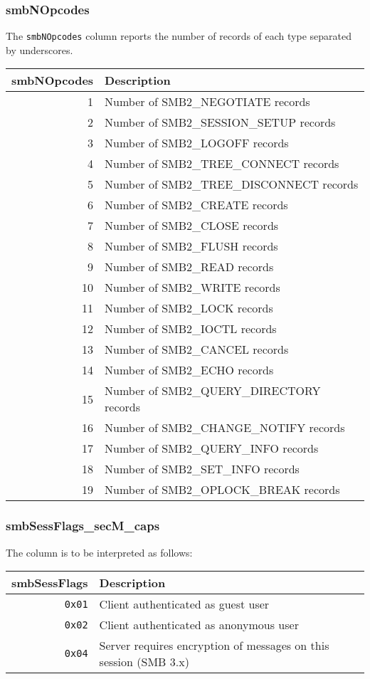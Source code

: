 \documentclass[documentation]{subfiles}
\begin{document}
\subsubsection{smbNOpcodes}\label{smbNOpcodes}
The {\tt smbNOpcodes} column reports the number of records of each type separated by underscores.
\begin{longtable}{rl}
    \toprule
    {\bf smbNOpcodes} & {\bf Description}\\
    \midrule\endhead%
    1  & Number of SMB2\_NEGOTIATE records\\
    2  & Number of SMB2\_SESSION\_SETUP records\\
    3  & Number of SMB2\_LOGOFF records\\
    4  & Number of SMB2\_TREE\_CONNECT records\\
    5  & Number of SMB2\_TREE\_DISCONNECT records\\
    6  & Number of SMB2\_CREATE records\\
    7  & Number of SMB2\_CLOSE records\\
    8  & Number of SMB2\_FLUSH records\\
    9  & Number of SMB2\_READ records\\
    10 & Number of SMB2\_WRITE records\\
    11 & Number of SMB2\_LOCK records\\
    12 & Number of SMB2\_IOCTL records\\
    13 & Number of SMB2\_CANCEL records\\
    14 & Number of SMB2\_ECHO records\\
    15 & Number of SMB2\_QUERY\_DIRECTORY records\\
    16 & Number of SMB2\_CHANGE\_NOTIFY records\\
    17 & Number of SMB2\_QUERY\_INFO records\\
    18 & Number of SMB2\_SET\_INFO records\\
    19 & Number of SMB2\_OPLOCK\_BREAK records\\
    \bottomrule
\end{longtable}

\subsubsection{smbSessFlags\_secM\_caps}\label{smbSessFlagsSecMCaps}
The {\tt{}} column is to be interpreted as follows:

\begin{longtable}{rl}
    \toprule
    {\bf smbSessFlags} & {\bf Description}\\
    \midrule\endhead%
    {\tt 0x01} & Client authenticated as guest user\\
    {\tt 0x02} & Client authenticated as anonymous user\\
    {\tt 0x04} & Server requires encryption of messages on this session (SMB 3.x)\\
    \bottomrule
\end{longtable}
\end{document}
